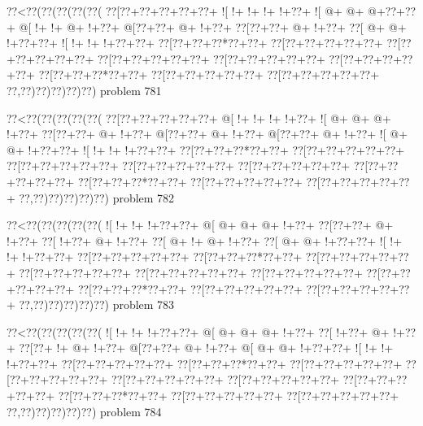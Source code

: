 \vbox{\vbox{\goo
\0??<\0??(\0??(\0??(\0??(\0??(
\0??[\0??+\0??+\0??+\0??+\0??+
\- ![\- !+\- !+\- !+\- !+\0??+
\- ![\- @+\- @+\- @+\0??+\0??+
\- @[\- !+\- !+\- @+\- !+\0??+
\- @[\0??+\0??+\- @+\- !+\0??+
\0??[\0??+\0??+\- @+\- !+\0??+
\0??[\- @+\- @+\- !+\0??+\0??+
\- ![\- !+\- !+\- !+\0??+\0??+
\0??[\0??+\0??+\0??*\0??+\0??+
\0??[\0??+\0??+\0??+\0??+\0??+
\0??[\0??+\0??+\0??+\0??+\0??+
\0??[\0??+\0??+\0??+\0??+\0??+
\0??[\0??+\0??+\0??+\0??+\0??+
\0??[\0??+\0??+\0??+\0??+\0??+
\0??[\0??+\0??+\0??*\0??+\0??+
\0??[\0??+\0??+\0??+\0??+\0??+
\0??[\0??+\0??+\0??+\0??+\0??+
\0??,\0??)\0??)\0??)\0??)\0??)
}
\hfil problem 781\hfil\break
}

\vbox{\vbox{\goo
\0??<\0??(\0??(\0??(\0??(\0??(
\0??[\0??+\0??+\0??+\0??+\0??+
\- @[\- !+\- !+\- !+\- !+\0??+
\- ![\- @+\- @+\- @+\- !+\0??+
\0??[\0??+\0??+\- @+\- !+\0??+
\- @[\0??+\0??+\- @+\- !+\0??+
\- @[\0??+\0??+\- @+\- !+\0??+
\- ![\- @+\- @+\- !+\0??+\0??+
\- ![\- !+\- !+\- !+\0??+\0??+
\0??[\0??+\0??+\0??*\0??+\0??+
\0??[\0??+\0??+\0??+\0??+\0??+
\0??[\0??+\0??+\0??+\0??+\0??+
\0??[\0??+\0??+\0??+\0??+\0??+
\0??[\0??+\0??+\0??+\0??+\0??+
\0??[\0??+\0??+\0??+\0??+\0??+
\0??[\0??+\0??+\0??*\0??+\0??+
\0??[\0??+\0??+\0??+\0??+\0??+
\0??[\0??+\0??+\0??+\0??+\0??+
\0??,\0??)\0??)\0??)\0??)\0??)
}
\hfil problem 782\hfil\break
}

\vbox{\vbox{\goo
\0??<\0??(\0??(\0??(\0??(\0??(
\- ![\- !+\- !+\- !+\0??+\0??+
\- @[\- @+\- @+\- @+\- !+\0??+
\0??[\0??+\0??+\- @+\- !+\0??+
\0??[\- !+\0??+\- @+\- !+\0??+
\0??[\- @+\- !+\- @+\- !+\0??+
\0??[\- @+\- @+\- !+\0??+\0??+
\- ![\- !+\- !+\- !+\0??+\0??+
\0??[\0??+\0??+\0??+\0??+\0??+
\0??[\0??+\0??+\0??*\0??+\0??+
\0??[\0??+\0??+\0??+\0??+\0??+
\0??[\0??+\0??+\0??+\0??+\0??+
\0??[\0??+\0??+\0??+\0??+\0??+
\0??[\0??+\0??+\0??+\0??+\0??+
\0??[\0??+\0??+\0??+\0??+\0??+
\0??[\0??+\0??+\0??*\0??+\0??+
\0??[\0??+\0??+\0??+\0??+\0??+
\0??[\0??+\0??+\0??+\0??+\0??+
\0??,\0??)\0??)\0??)\0??)\0??)
}
\hfil problem 783\hfil\break
}

\vbox{\vbox{\goo
\0??<\0??(\0??(\0??(\0??(\0??(
\- ![\- !+\- !+\- !+\0??+\0??+
\- @[\- @+\- @+\- @+\- !+\0??+
\0??[\- !+\0??+\- @+\- !+\0??+
\0??[\0??+\- !+\- @+\- !+\0??+
\- @[\0??+\0??+\- @+\- !+\0??+
\- @[\- @+\- @+\- !+\0??+\0??+
\- ![\- !+\- !+\- !+\0??+\0??+
\0??[\0??+\0??+\0??+\0??+\0??+
\0??[\0??+\0??+\0??*\0??+\0??+
\0??[\0??+\0??+\0??+\0??+\0??+
\0??[\0??+\0??+\0??+\0??+\0??+
\0??[\0??+\0??+\0??+\0??+\0??+
\0??[\0??+\0??+\0??+\0??+\0??+
\0??[\0??+\0??+\0??+\0??+\0??+
\0??[\0??+\0??+\0??*\0??+\0??+
\0??[\0??+\0??+\0??+\0??+\0??+
\0??[\0??+\0??+\0??+\0??+\0??+
\0??,\0??)\0??)\0??)\0??)\0??)
}
\hfil problem 784\hfil\break
}

